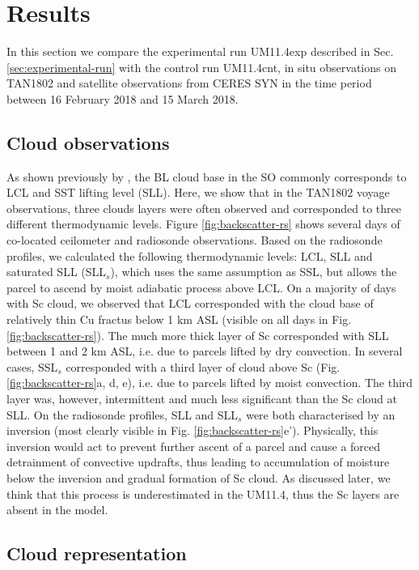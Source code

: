 \section{Results}
\label{sec:results}

In this section we compare the experimental run UM11.4exp described in Sec. \ref{sec:experimental-run}
with the control run UM11.4cnt,
in situ observations on TAN1802 and satellite observations from CERES SYN
in the time period between 16 February 2018 and 15 March 2018.

\subsection{Cloud observations}

As shown previously by \cite{kuma2019}, the BL cloud base in the SO commonly
corresponds to LCL and SST lifting level (SLL). Here, we show
that in the TAN1802 voyage observations, three clouds layers were often observed
and corresponded to three different thermodynamic levels. Figure
\ref{fig:backscatter-rs} shows several days of co-located ceilometer and
radiosonde observations. Based on the radiosonde profiles, we calculated the
following thermodynamic levels: LCL, SLL and saturated SLL (SLL$_s$), which
uses the same assumption as SSL, but allows the parcel to ascend by moist
adiabatic process above LCL. On a majority of days with Sc cloud, we observed
that LCL corresponded with the cloud base of relatively thin Cu fractus
below 1 km ASL (visible on all days in Fig. \ref{fig:backscatter-rs}). The much more thick
layer of Sc corresponded with SLL between 1 and 2 km ASL, i.e. due to parcels lifted by dry convection.
In several cases, SSL$_s$ corresponded with a third layer of cloud above Sc
(Fig. \ref{fig:backscatter-rs}a, d, e), i.e. due to parcels lifted by moist
convection. The third layer was, however, intermittent and much less significant
than the Sc cloud at SLL. On the radiosonde profiles, SLL and SLL$_s$ were
both characterised by an inversion (most clearly visible in Fig.
\ref{fig:backscatter-rs}e'). Physically, this inversion would act to prevent
further ascent of a parcel and cause a forced detrainment of convective updrafts,
thus leading to accumulation of moisture below the inversion and gradual
formation of Sc cloud. As discussed later, we think that this process is
underestimated in the UM11.4, thus the Sc layers are absent in the model.

\subsection{Cloud representation}
\label{sec:cloud-representation}

